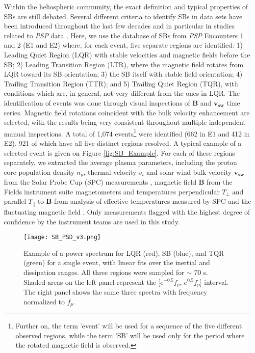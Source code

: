 \documentclass[]{aastex62}
\begin{document}
Within the heliospheric community, the exact definition and typical properties of SBs are still debated. Several different criteria to identify SBs in data sets have been introduced throughout the last few decades \citep{Yamauchi_2004_JGRA,Horbury_2018_MNRAS} and in particular in studies related to \emph{PSP} data \citep{DudokdeWit_2020_ApJS,Horbury_2020_ApJS,McManus_2020_ApJS,Mozer_2020_ApJS,Bourouaine_2020_ApjL}. Here, we use the database of SBs from \emph{PSP} Encounters 1 and 2 (E1 and E2) where, for each event, five separate regions are identified: 1) Leading Quiet Region (LQR) with stable velocities and magnetic fields before the SB; 2) Leading Transition Region (LTR), where the magnetic field rotates from LQR toward its SB orientation; 3) the SB itself with stable field orientation; 4) Trailing Transition Region (TTR); and 5) Trailing Quiet Region (TQR), with conditions which are, in general, not very different from the ones in LQR. The identification of events was done through visual inspections of $\mathbf{B}$ and $\mathbf{v_{sw}}$ time series. Magnetic field rotations coincident with the bulk velocity enhancement are selected, with the results being very consistent throughout multiple independent manual inspections. A total of 1,074 events\footnote{Further on, the term 'event' will be used for a sequence of the five different observed regions, while the term 'SB' will be used only for the period where the rotated magnetic field is observed.} were identified (662 in E1 and 412 in E2), 921 of which have all five distinct regions resolved. A typical example of a selected event is given on Figure \ref{fig:SB_Example}. For each of these regions separately, we extracted the average plasma parameters, including the proton core population density $n_p$, thermal velocity $v_t$ and solar wind bulk velocity $\mathbf{v_{sw}}$ from the Solar Probe Cup (SPC) measurements \citep{Kasper_2015,Case_2020_ApJS_SPC}, magnetic field $\mathbf{B}$ from the Fields instrument suite magnetometers \citep{Bale_2016} and temperatures perpendicular $T_\perp$ and parallel $T_{||}$ to $\mathbf{B}$ from analysis of effective temperatures measured by SPC and the fluctuating magnetic field \citep{Huang_2020_ApJS}. Only measurements flagged with the highest degree of confidence by the instrument teams are used in this study.


\begin{figure}
\centering
\texttt{[image: SB\_PSD\_v3.png]}
\caption{Example of a power spectrum for LQR (red), SB (blue), and TQR (green) for a single event, with linear fits over the inertial and dissipation ranges. All three regions were sampled for $\sim$ 70 s. Shaded areas on the left panel represent the [$e^{-0.5} f_p$, $e^{0.5} f_p$] interval. The right panel shows the same three spectra with frequency normalized to $f_p$. }
\label{fig:SB_Fit}
\end{figure}
\end{document}
